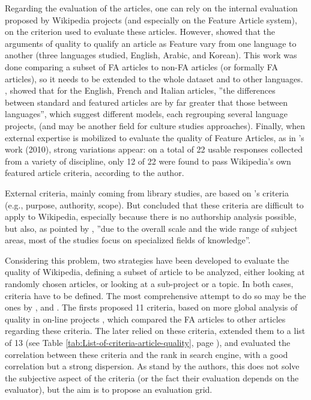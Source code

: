 Regarding the evaluation of the articles, one can rely on the internal
evaluation proposed by Wikipedia projects (and especially on the Feature
Article system), on the criterion used to evaluate these articles.
However, \citet{Stviliaetal09} showed that the arguments of quality
to qualify an article as Feature vary from one language to another
(three languages studied, English, Arabic, and Korean). This work
was done comparing a subset of FA articles to non-FA articles (or
formally FA articles), so it needs to be extended to the whole dataset
and to other languages. \citealp[p. 5]{Hammwohner07}, showed that
for the English, French and Italian articles, ''the differences between
standard and featured articles are by far greater that those between
languages'', which suggest different models, each regrouping several
language projects, (and may be another field for culture studies approaches).
Finally, when external expertise is mobilized to evaluate the quality
of Feature Articles, as in \citeauthor{Lindsey10}'s work (2010),
strong variations appear: on a total of 22 usable responses collected
from a variety of discipline, only 12 of 22 were found to pass Wikipedia's
own featured article criteria, according to the author.

External criteria, mainly coming from library studies, are based on
\citet{Katz02a}'s criteria (e.g., purpose, authority, scope). But
\citet{WallaceVanFleet05,EhmannLargeBeheshti08} concluded that these
criteria are difficult to apply to Wikipedia, especially because there
is no authorship analysis possible, but also, as pointed by \citet{LewandowskiSpree11},
''due to the overall scale and the wide range of subject areas, most
of the studies focus on specialized fields of knowledge''. 

Considering this problem, two strategies have been developed to evaluate
the quality of Wikipedia, defining a subset of article to be analyzed,
either looking at randomly chosen articles, or looking at a sub-project
or a topic. In both cases, criteria have to be defined. The most comprehensive
attempt to do so may be the ones by \citet{Stviliaetal08}, and \citet{LewandowskiSpree11}.
The firsts proposed 11 criteria, based on more global analysis of
quality in on-line projects \citep{Stviliaetal07}, which compared
the FA articles to other articles regarding these criteria. The later
relied on these criteria, extended them to a list of 13 (see Table
\ref{tab:List-of-criteria-article-quality}, page \pageref{tab:List-of-criteria-article-quality}),
and evaluated the correlation between these criteria and the rank
in search engine, with a good correlation but a strong dispersion.
As stand by the authors, this does not solve the subjective aspect
of the criteria (or the fact their evaluation depends on the evaluator),
but the aim is to propose an evaluation grid.

